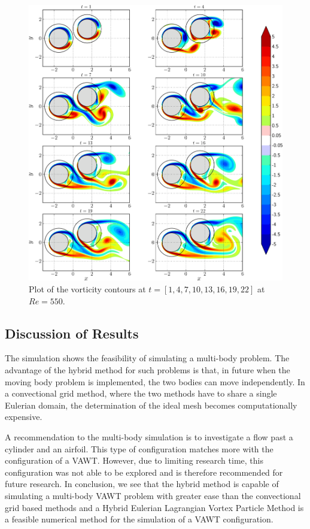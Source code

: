 	\begin{figure}[!b]
	\centering
	\includegraphics[width=\linewidth]{./figures/validation/multipleCylinder/hybrid_multipleCylinder_contours_compressed-crop.png}
	\caption{Plot of the vorticity contours at $t=[1,4,7,10,13,16,19,22]$ at $Re=550$.}
	\label{fig:hybrid_multipleCylinder_contours_compressed-crop}
	\end{figure}

\subsection{Discussion of Results}

The simulation shows the feasibility of simulating a multi-body problem. The advantage of the hybrid method for such problems is that, in future when the moving body problem is implemented, the two bodies can move independently. In a convectional grid method, where the two methods have to share a single Eulerian domain, the determination of the ideal mesh becomes computationally expensive.

A recommendation to the multi-body simulation is to investigate a flow past a cylinder and an airfoil. This type of configuration matches more with the configuration of a VAWT. However, due to limiting research time, this configuration was not able to be explored and is therefore recommended for future research. In conclusion, we see that the hybrid method is capable of simulating a multi-body VAWT problem with greater ease than the convectional grid based methods and a Hybrid Eulerian Lagrangian Vortex Particle Method is a feasible numerical method for the simulation of a VAWT configuration.

